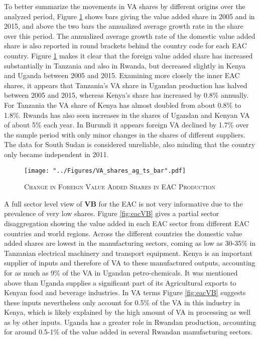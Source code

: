 \documentclass[a4paper]{article}
\begin{document}
To better summarize the movements in VA shares by different origins over the analyzed period, Figure \ref{fig:EACVB_ts_bar} shows  bars giving the value added share in 2005 and in 2015, and above the two bars the annualized average growth rate in the share over this period. The annualized average growth rate of the domestic value added share is also reported in round brackets behind the country code for each EAC country. Figure \ref{fig:EACVB_ts_bar} makes it clear that the foreign value added share has increased substantially in Tanzania and also in Rwanda, but decreased slightly in Kenya and Uganda between 2005 and 2015.  Examining more closely the inner EAC shares, it appears that Tanzania's VA share in Ugandan production has halved between 2005 and 2015, whereas Kenya's share has increased by 0.8\% annually. For Tanzania the VA share of Kenya has almost doubled from about 0.8\% to 1.8\%. Rwanda has also seen increases in the shares of Ugandan and Kenyan VA of about 5\% each year. In Burundi it appears foreign VA declined by 1.7\% over the sample period with only minor changes in the shares of different suppliers. The data for South Sudan is considered unreliable, also minding that the country only became independent in 2011. 

\begin{figure}[h!]
\centering
\caption{\label{fig:EACVB_ts_bar}\textsc{Change in Foreign Value Added Shares in EAC Production}}
\texttt{[image: "../Figures/VA\_shares\_ag\_ts\_bar".pdf]} %
\end{figure}
\FloatBarrier

A full sector level view of \textbf{VB} for the EAC is not very informative due to the prevalence of very low shares. Figure \ref{fig:eacVB} gives a partial sector disaggregation showing the value added in each EAC sector from different EAC countries and world regions. Across the different countries the domestic value added shares are lowest in the manufacturing sectors, coming as low as 30-35\%  in Tanzanian electrical machinery and transport equipment. Kenya is an important supplier of inputs and therefore of VA to these manufactured outputs, accounting for as much as 9\% of the VA in Ugandan petro-chemicals. It was mentioned above than Uganda supplies a significant part of its Agricultural exports to Kenyan food and beverage industries. In VA terms Figure \ref{fig:eacVB} suggests these inputs nevertheless only account for 0.5\% of the VA in this industry in Kenya, which is likely explained by the high amount of VA in processing as well as by other inputs. Uganda has a greater role in Rwandan production, accounting for around 0.5-1\% of the value added in several Rwandan manufacturing sectors. \newline
\end{document}

